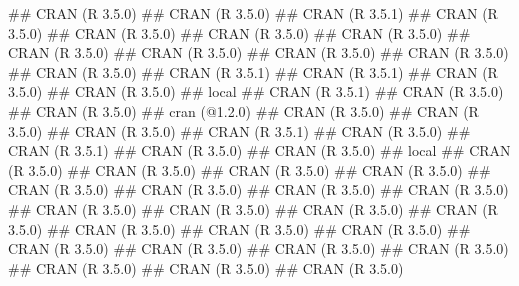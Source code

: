 \documentclass[]{book}
\newenvironment{Shaded}{\begin{snugshade}}{\end{snugshade}}
\newcommand{\NormalTok}[1]{#1}
\theoremstyle{definition}
\theoremstyle{definition}
\theoremstyle{definition}
\theoremstyle{remark}
\begin{document}
\begin{Shaded}
\begin{Highlighting}[]
\NormalTok{##  CRAN (R 3.5.0)                   }
\NormalTok{##  CRAN (R 3.5.0)                   }
\NormalTok{##  CRAN (R 3.5.1)                   }
\NormalTok{##  CRAN (R 3.5.0)                   }
\NormalTok{##  CRAN (R 3.5.0)                   }
\NormalTok{##  CRAN (R 3.5.0)                   }
\NormalTok{##  CRAN (R 3.5.0)                   }
\NormalTok{##  CRAN (R 3.5.0)                   }
\NormalTok{##  CRAN (R 3.5.0)                   }
\NormalTok{##  CRAN (R 3.5.0)                   }
\NormalTok{##  CRAN (R 3.5.0)                   }
\NormalTok{##  CRAN (R 3.5.0)                   }
\NormalTok{##  CRAN (R 3.5.1)                   }
\NormalTok{##  CRAN (R 3.5.1)                   }
\NormalTok{##  CRAN (R 3.5.0)                   }
\NormalTok{##  CRAN (R 3.5.0)                   }
\NormalTok{##  local                            }
\NormalTok{##  CRAN (R 3.5.1)                   }
\NormalTok{##  CRAN (R 3.5.0)                   }
\NormalTok{##  CRAN (R 3.5.0)                   }
\NormalTok{##  cran (@1.2.0)                    }
\NormalTok{##  CRAN (R 3.5.0)                   }
\NormalTok{##  CRAN (R 3.5.0)                   }
\NormalTok{##  CRAN (R 3.5.0)                   }
\NormalTok{##  CRAN (R 3.5.1)                   }
\NormalTok{##  CRAN (R 3.5.0)                   }
\NormalTok{##  CRAN (R 3.5.1)                   }
\NormalTok{##  CRAN (R 3.5.0)                   }
\NormalTok{##  CRAN (R 3.5.0)                   }
\NormalTok{##  local                            }
\NormalTok{##  CRAN (R 3.5.0)                   }
\NormalTok{##  CRAN (R 3.5.0)                   }
\NormalTok{##  CRAN (R 3.5.0)                   }
\NormalTok{##  CRAN (R 3.5.0)                   }
\NormalTok{##  CRAN (R 3.5.0)                   }
\NormalTok{##  CRAN (R 3.5.0)                   }
\NormalTok{##  CRAN (R 3.5.0)                   }
\NormalTok{##  CRAN (R 3.5.0)                   }
\NormalTok{##  CRAN (R 3.5.0)                   }
\NormalTok{##  CRAN (R 3.5.0)                   }
\NormalTok{##  CRAN (R 3.5.0)                   }
\NormalTok{##  CRAN (R 3.5.0)                   }
\NormalTok{##  CRAN (R 3.5.0)                   }
\NormalTok{##  CRAN (R 3.5.0)                   }
\NormalTok{##  CRAN (R 3.5.0)                   }
\NormalTok{##  CRAN (R 3.5.0)                   }
\NormalTok{##  CRAN (R 3.5.0)                   }
\NormalTok{##  CRAN (R 3.5.0)                   }
\NormalTok{##  CRAN (R 3.5.0)                   }
\NormalTok{##  CRAN (R 3.5.0)                   }
\NormalTok{##  CRAN (R 3.5.0)                   }
\NormalTok{##  CRAN (R 3.5.0)                   }

\end{Highlighting}
\end{Shaded}
\end{document}
